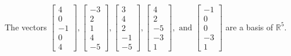 \begin{exercise}
\begin{exerciseStatement}
  \end{exerciseStatement}
  \begin{exerciseAnswer}
   The vectors \(\left[\begin{array}{r}
4 \\
0 \\
-1 \\
0 \\
4
\end{array}\right] , \left[\begin{array}{r}
-3 \\
2 \\
1 \\
4 \\
-5
\end{array}\right] , \left[\begin{array}{r}
3 \\
4 \\
2 \\
-1 \\
-5
\end{array}\right] , \left[\begin{array}{r}
4 \\
2 \\
-5 \\
-3 \\
1
\end{array}\right] , \text{ and } \left[\begin{array}{r}
-1 \\
0 \\
0 \\
-3 \\
1
\end{array}\right]\) 
  	 are  a basis of \(\mathbb{R}^5\).
  


  \end{exerciseAnswer}
\end{exercise}